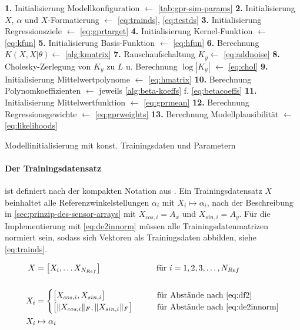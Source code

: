 \begin{algorithm}[bhp]
	\SetAlgoLined
	\textbf{1.} Initialisierung Modellkonfiguration $\leftarrow$ \autoref{tab:gpr-sim-params}\;
	\textbf{2.} Initialisierung $X$, $\alpha$ und $X$-Formatierung $\leftarrow$ \autoref{eq:trainds}, \autoref{eq:testds}\;
	\textbf{3.} Initialisierung Regressionsziele $\leftarrow$ \autoref{eq:gprtarget}\;
	\textbf{4.} Initialisierung Kernel-Funktion $\leftarrow$ \autoref{eq:kfun}\;
	\textbf{5.} Initialisierung Basis-Funktion $\leftarrow$ \autoref{eq:hfun}\;
	\textbf{6.} Berechnung $K(X,X|\theta) \leftarrow$ \autoref{alg:kmatrix}\;
	\textbf{7.} Rauschaufschaltung $K_y \leftarrow$ \autoref{eq:addnoise}\;
	\textbf{8.} Cholesky-Zerlegung von $K_y$ zu $L$ u. Berechnung $\log |K_y|$ $\leftarrow$ \autoref{eq:chol}\;
	\textbf{9.} Initialisierung Mittelwertpolynome $\leftarrow$ \autoref{eq:hmatrix}\;
	\textbf{10.} Berechnung Polynomkoeffizienten $\leftarrow$ jeweils \autoref{alg:beta-koeffs} f. \autoref{eq:betacoeffs}\;
	\textbf{11.} Initialisierung Mittelwertfunktion $\leftarrow$ \autoref{eq:gprmean}\;
	\textbf{12.} Berechnung Regressionsgewichte $\leftarrow$ \autoref{eq:gprweights}\;
	\textbf{13.} Berechnung Modellplausibilität $\leftarrow$ \autoref{eq:likelihoods}\;
	\caption{Modellinitialisierung mit konst. Trainingsdaten und Parametern}
	\label{alg:gprinit}
\end{algorithm}


\clearpage


\paragraph*{Der Trainingsdatensatz} ist definiert nach der kompakten Notation aus \citeauthor{Rasmussen2006}\cite{Rasmussen2006}. Ein Trainingsdatensatz $X$ beinhaltet alle Referenzwinkelstellungen $\alpha_i$ mit $X_i \mapsto \alpha_i$, nach der Beschreibung in \autoref{sec:prinzip-des-sensor-arrays} mit $X_{cos,i} = A_x$ und $X_{sin,i} = A_y$. Für die Implementierung mit \autoref{eq:de2innorm} müssen alle Trainingsdatenmatrizen normiert sein, sodass sich Vektoren als Trainingsdaten abbilden, siehe \autoref{eq:trainds}.


\begin{align}\label{eq:trainds}
	X   &= \big[ X_i, \ldots X_{N_{Ref}} \big] \qquad\qquad\qquad\quad\!  \text{für } i = 1,2,3,\ldots,N_{Ref} \nonumber \\
	\\
	X_i &= 
		\begin{cases}
			\big[ X_{cos,i}, X_{sin,i} \big]             &\qquad \text{für Abstände nach \autoref{eq:df2}} \\
			\big[ \|X_{cos,i}\|_F, \|X_{sin,i}\|_F \big] &\qquad \text{für Abstände nach \autoref{eq:de2innorm}}
		\end{cases} \nonumber \\
	X_i & \mapsto \alpha_i \nonumber
\end{align}


